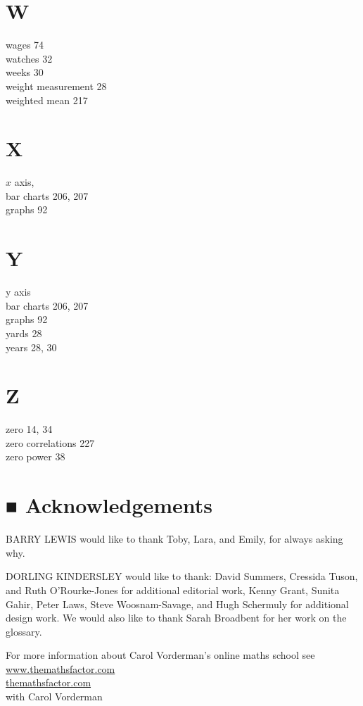 \documentclass[10pt]{article}
\begin{document}
\section*{W}
wages 74\\
watches 32\\
weeks 30\\
weight measurement 28\\
weighted mean 217

\section*{X}
$x$ axis,\\
bar charts 206, 207\\
graphs 92

\section*{Y}
y axis\\
bar charts 206, 207\\
graphs 92\\
yards 28\\
years 28, 30

\section*{Z}
zero 14, 34\\
zero correlations 227\\
zero power 38

\section*{■ Acknowledgements}
BARRY LEWIS would like to thank Toby, Lara, and Emily, for always asking why.

DORLING KINDERSLEY would like to thank: David Summers, Cressida Tuson, and Ruth O'Rourke-Jones for additional editorial work, Kenny Grant, Sunita Gahir, Peter Laws, Steve Woosnam-Savage, and Hugh Schermuly for additional design work. We would also like to thank Sarah Broadbent for her work on the glossary.

For more information about Carol Vorderman's online maths school see \href{http://www.themathsfactor.com}{www.themathsfactor.com}\\
\href{http://themathsfactor.com}{themathsfactor.com}\\
with Carol Vorderman
\end{document}
